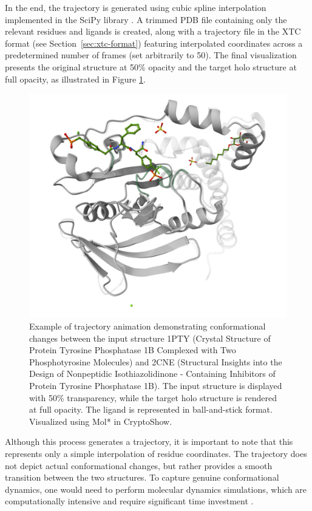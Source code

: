 In the end, the trajectory is generated using cubic spline interpolation \cite{mckinley1998cubic} implemented in the SciPy library \cite{virtanen2020scipy}. A trimmed PDB file containing only the relevant residues and ligands is created, along with a trajectory file in the XTC format (see Section~\ref{sec:xtc-format}) featuring interpolated coordinates across a predetermined number of frames (set arbitrarily to 50). The final visualization presents the original structure at 50\% opacity and the target holo structure at full opacity, as illustrated in Figure \ref{fig:trajectory-animation}.

\begin{figure}[htbp]
    \centering
    \includegraphics[width=\textwidth]{img/trajectory_animation.png}
    \caption{Example of trajectory animation demonstrating conformational changes between the input structure 1PTY (Crystal Structure of Protein Tyrosine Phosphatase 1B Complexed with Two Phosphotyrosine Molecules) and 2CNE (Structural Insights into the Design of Nonpeptidic Isothiazolidinone - Containing Inhibitors of Protein Tyrosine Phosphatase 1B). The input structure is displayed with 50\% transparency, while the target holo structure is rendered at full opacity. The ligand is represented in ball-and-stick format. Visualized using Mol* in CryptoShow.}
    \label{fig:trajectory-animation}
\end{figure}

Although this process generates a trajectory, it is important to note that this represents only a simple interpolation of residue coordinates. The trajectory does not depict actual conformational changes, but rather provides a smooth transition between the two structures. To capture genuine conformational dynamics, one would need to perform molecular dynamics simulations, which are computationally intensive and require significant time investment \cite{schlitter1993targeted}.

